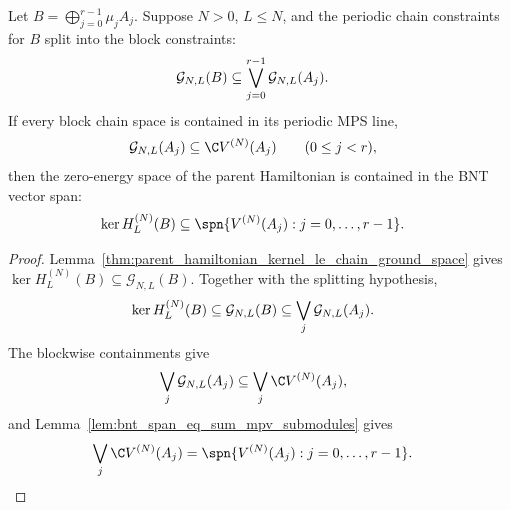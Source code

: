\begin{lemma}
    \label{lem:block_diagonal_kernel_to_bnt_span_from_chain_splitting}
    \leanok
    Let $B=\bigoplus_{j=0}^{r-1}\mu_jA_j$. Suppose $N>0$, $L\le N$, and
    the periodic chain constraints for $B$ split into the block constraints:
    \begin{align}
        \mathcal G_{N,L}(B)
         & \subseteq
        \bigvee_{j=0}^{r-1}\mathcal G_{N,L}(A_j). \notag
    \end{align}
    If every block chain space is contained in its periodic MPS line,
    \begin{align}
        \mathcal G_{N,L}(A_j)
         & \subseteq \C V^{(N)}(A_j)
        \qquad (0\le j<r), \notag
    \end{align}
    then the zero-energy space of the parent Hamiltonian is contained in the
    BNT vector span:
    \begin{align}
        \ker H_L^{(N)}(B)
         & \subseteq
        \spn\{V^{(N)}(A_j):j=0,\ldots,r-1\}. \notag
    \end{align}
\end{lemma}

\begin{proof}
    \leanok
    Lemma~\ref{thm:parent_hamiltonian_kernel_le_chain_ground_space} gives
    $\ker H_L^{(N)}(B)\subseteq\mathcal G_{N,L}(B)$. Together with the
    splitting hypothesis,
    \begin{align}
        \ker H_L^{(N)}(B)
         & \subseteq \mathcal G_{N,L}(B) \subseteq \bigvee_j\mathcal G_{N,L}(A_j). \notag
    \end{align}
    The blockwise containments give
    \begin{align}
        \bigvee_j\mathcal G_{N,L}(A_j)
         & \subseteq \bigvee_j\C V^{(N)}(A_j), \notag
    \end{align}
    and Lemma~\ref{lem:bnt_span_eq_sum_mpv_submodules} gives
    \begin{align}
        \bigvee_j\C V^{(N)}(A_j)
         & =\spn\{V^{(N)}(A_j):j=0,\ldots,r-1\}. \notag
    \end{align}
\end{proof}

